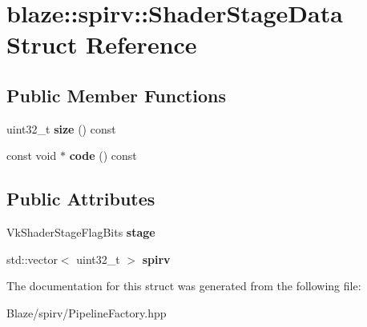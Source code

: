 \hypertarget{structblaze_1_1spirv_1_1ShaderStageData}{}\section{blaze\+:\+:spirv\+:\+:Shader\+Stage\+Data Struct Reference}
\label{structblaze_1_1spirv_1_1ShaderStageData}
\subsection*{Public Member Functions}
\begin{DoxyCompactItemize}
\item 
\mbox{\label{structblaze_1_1spirv_1_1ShaderStageData_a662a5b292a2bad929c7d516701419bd3}} 
uint32\+\_\+t {\bfseries size} () const
\item 
\mbox{\label{structblaze_1_1spirv_1_1ShaderStageData_aff9ed5ed66f552994cae6afb3e8093e6}} 
const void $\ast$ {\bfseries code} () const
\end{DoxyCompactItemize}
\subsection*{Public Attributes}
\begin{DoxyCompactItemize}
\item 
\mbox{\label{structblaze_1_1spirv_1_1ShaderStageData_a70dc204fcb4a786ac84f96b7419bac90}} 
Vk\+Shader\+Stage\+Flag\+Bits {\bfseries stage}
\item 
\mbox{\label{structblaze_1_1spirv_1_1ShaderStageData_aec317339cb259e4882e5cbd68bad2d35}} 
std\+::vector$<$ uint32\+\_\+t $>$ {\bfseries spirv}
\end{DoxyCompactItemize}


The documentation for this struct was generated from the following file\+:\begin{DoxyCompactItemize}
\item 
Blaze/spirv/Pipeline\+Factory.\+hpp\end{DoxyCompactItemize}
